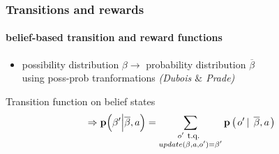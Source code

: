 \documentclass[12pt,svgnames,table]{beamer}
\newcommand{\paren}[1]{\left( \left. #1 \right. \right)}
\newcommand{\sachant}{\, \right| \left. \,}
\begin{document}
\begin{frame}
\frametitle{Transitions and rewards}
\framesubtitle{\footnotesize belief-based transition and reward functions}

\begin{itemize}
\item possibility distribution $\beta \rightarrow$ probability distribution $\overline{\beta}$\\ 
using poss-prob tranformations {\footnotesize \textit{(Dubois $\&$ Prade)}}%
\end{itemize}
\begin{block}{Transition function on belief states}
\[ \Rightarrow \textbf{p} \Big( \beta' \Big\vert \overline{\beta},a \Big) = \sum_{ \substack{ o' \mbox{ \footnotesize t.q. } \\ update(\beta,a,o')=\beta'} }\textbf{p}\paren{o'\sachant \overline{\beta},a}\]
\end{block}
\end{frame}
\end{document}
